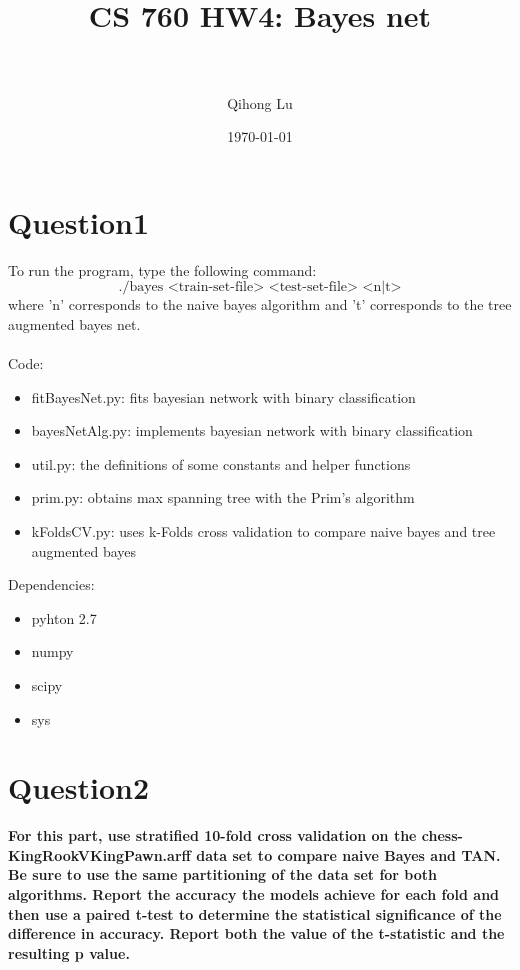 \documentclass[paper=a4, fontsize=11pt]{scrartcl} %
\title{	
\normalfont \normalsize 
\horrule{0.5pt} \\[0.4cm] %
\huge CS 760 HW4: Bayes net\\ %
\horrule{2pt} \\[0.5cm] %
}
\author{Qihong Lu} %
\date{\normalsize\today} %
\numberwithin{equation}{section} %
\numberwithin{figure}{section} %
\numberwithin{table}{section} %
\begin{document}
\maketitle %


\section*{Question1}

To run the program, type the following command: 
$$ \text{./bayes <train-set-file> <test-set-file> <n|t>} $$ 
where 'n' corresponds to the naive bayes algorithm and 't' corresponds to the tree augmented bayes net. \\\\

Code: 
\begin{itemize}
	\item fitBayesNet.py: fits bayesian network with binary classification 
	\item bayesNetAlg.py: implements bayesian network with binary classification 
	\item util.py: the definitions of some constants and helper functions 
	\item prim.py: obtains max spanning tree with the Prim's algorithm 
	\item kFoldsCV.py: uses k-Folds cross validation to compare naive bayes and tree augmented bayes
\end{itemize}
 
\hfill 

Dependencies: 
\begin{itemize}
  \item pyhton 2.7 
  \item numpy 
  \item scipy 
  \item sys
\end{itemize}





\section*{Question2}
\textbf{For this part, use stratified 10-fold cross validation on the chess-KingRookVKingPawn.arff data set to compare naive Bayes and TAN. Be sure to use the same partitioning of the data set for both algorithms. Report the accuracy the models achieve for each fold and then use a paired t-test to determine the statistical significance of the difference in accuracy. Report both the value of the t-statistic and the resulting p value.\\}
\end{document}
